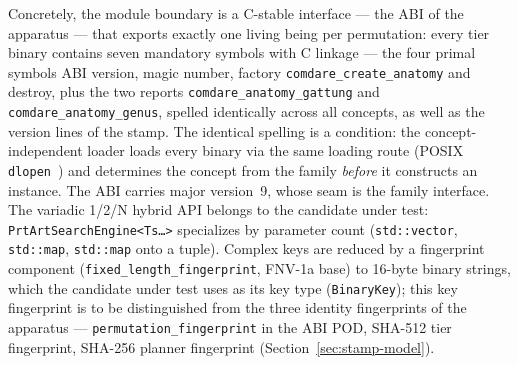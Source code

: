 \begin{nurkurz}
Concretely, the module boundary is a C-stable interface --- the ABI of the apparatus --- that exports
exactly one living being per permutation: every tier binary contains seven mandatory symbols with C
linkage --- the four primal symbols ABI version, magic number, factory
\texttt{comdare\_\allowbreak{}create\_\allowbreak{}anatomy} and destroy, plus the two reports
\texttt{comdare\_\allowbreak{}anatomy\_\allowbreak{}gattung} and
\texttt{comdare\_\allowbreak{}anatomy\_\allowbreak{}genus}, spelled identically across all concepts, as
well as the version lines of the stamp. The identical spelling is a condition: the concept-independent
loader loads every binary via the same loading route (POSIX \texttt{dlopen}~\cite{posix_dlopen}) and
determines the concept from the family \emph{before} it constructs an instance. The ABI carries major
version~9, whose seam is the family interface. The variadic 1/2/N hybrid API belongs to the candidate
under test: \texttt{PrtArtSearchEngine<Ts\ldots>} specializes by parameter count (\texttt{std::vector},
\texttt{std::map}, \texttt{std::map} onto a tuple). Complex keys are reduced by a fingerprint component
(\texttt{fixed\_\allowbreak{}length\_\allowbreak{}fingerprint}, FNV-1a base) to 16-byte binary strings,
which the candidate under test uses as its key type (\texttt{BinaryKey}); this key fingerprint is to be
distinguished from the three identity fingerprints of the apparatus ---
\texttt{permutation\_\allowbreak{}fingerprint} in the ABI POD, SHA-512 tier fingerprint, SHA-256
planner fingerprint (Section~\ref{sec:stamp-model}).
\end{nurkurz}

